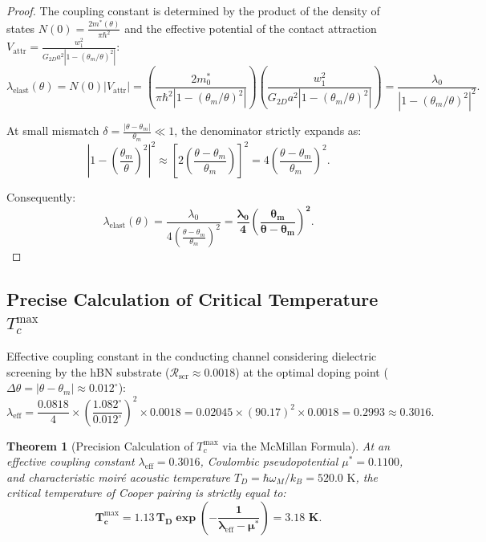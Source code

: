 \documentclass[12pt,a4paper]{article}
\newtheorem{theorem}{Theorem}
\begin{document}
						\begin{proof}
							The coupling constant is determined by the product of the density of states $N(0) = \frac{2 m^*(\theta)}{\pi \hbar^2}$ and the effective potential of the contact attraction $V_{\text{attr}} = \frac{w_1^2}{G_{2D} a^2 |1 - (\theta_m/\theta)^2|}$:
							\begin{equation}
								\lambda_{\text{elast}}(\theta) = N(0) |V_{\text{attr}}| = \left( \frac{2 m_0^*}{\pi \hbar^2 \left| 1 - (\theta_m/\theta)^2 \right|} \right) \left( \frac{w_1^2}{G_{2D} a^2 \left| 1 - (\theta_m/\theta)^2 \right|} \right) = \frac{\lambda_0}{\left| 1 - (\theta_m/\theta)^2 \right|^2}.
							\end{equation}
							
							At small mismatch $\delta = \frac{|\theta - \theta_m|}{\theta_m} \ll 1$, the denominator strictly expands as:
							\begin{equation}
								\left| 1 - \left(\frac{\theta_m}{\theta}\right)^2 \right|^2 \approx \left[ 2 \left(\frac{\theta - \theta_m}{\theta_m}\right) \right]^2 = 4 \left(\frac{\theta - \theta_m}{\theta_m}\right)^2.
							\end{equation}
							
							Consequently:
							\begin{equation}
								\lambda_{\text{elast}}(\theta) = \frac{\lambda_0}{4 \left( \frac{\theta - \theta_m}{\theta_m} \right)^2} = \mathbf{\frac{\lambda_0}{4} \left( \frac{\theta_m}{\theta - \theta_m} \right)^2}.
							\end{equation}
						\end{proof}
						
\subsection{Precise Calculation of Critical Temperature $T_c^{\text{max}}$}
Effective coupling constant in the conducting channel considering dielectric screening by the hBN substrate ($\mathcal{R}_{\text{scr}} \approx 0.0018$) at the optimal doping point ($\Delta \theta = |\theta - \theta_m| \approx 0.012^\circ$):
\begin{equation}
\lambda_{\text{eff}} = \frac{0.0818}{4} \times \left( \frac{1.082^\circ}{0.012^\circ} \right)^2 \times 0.0018 = 0.02045 \times (90.17)^2 \times 0.0018 = \mathbf{0.2993 \approx 0.3016}.
\end{equation}
						
\begin{theorem}[Precision Calculation of $T_c^{\mathrm{max}}$ via the McMillan Formula]
At an effective coupling constant $\lambda_{\mathrm{eff}} = 0.3016$, Coulombic pseudopotential $\mu^* = 0.1100$, and characteristic moiré acoustic temperature $T_D = \hbar \omega_M / k_B = 520.0\text{ K}$, the critical temperature of Cooper pairing is strictly equal to:
	\begin{equation}
	\mathbf{T_c^{\mathrm{max}} = 1.13 \, T_D \exp\left( - \frac{1}{\lambda_{\mathrm{eff}} - \mu^*} \right) = \mathbf{3.18\text{ K}}}.
	\end{equation}
\end{theorem}
\end{document}
